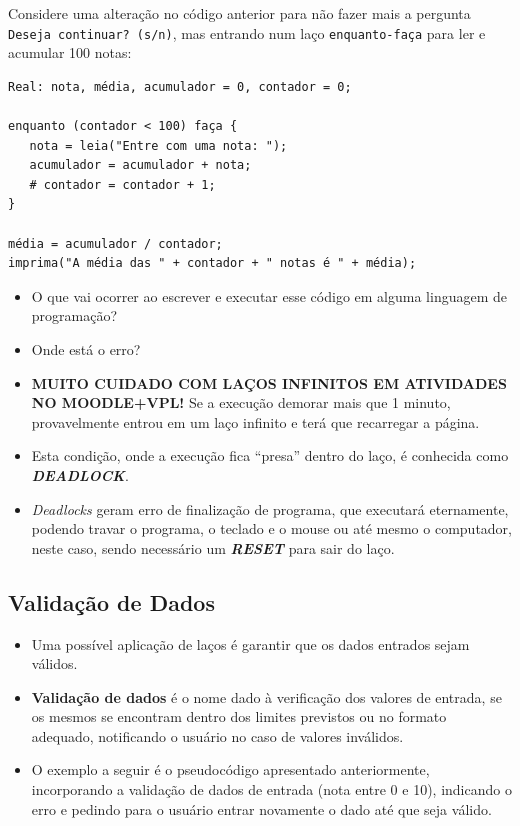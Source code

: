 \documentclass[12pt,a4paper]{article}
\providecommand{\tightlist}{%
      \setlength{\itemsep}{0pt}\setlength{\parskip}{0pt}}
\begin{document}
Considere uma alteração no código anterior para não fazer mais a
pergunta \texttt{Deseja\ continuar?\ (s/n)}, mas entrando num laço
\texttt{enquanto-faça} para ler e acumular 100 notas:

\begin{verbatim}
Real: nota, média, acumulador = 0, contador = 0;

enquanto (contador < 100) faça {
   nota = leia("Entre com uma nota: ");
   acumulador = acumulador + nota;
   # contador = contador + 1;
}

média = acumulador / contador;
imprima("A média das " + contador + " notas é " + média);
\end{verbatim}

    \begin{itemize}
\tightlist
\item
  O que vai ocorrer ao escrever e executar esse código em alguma
  linguagem de programação?
\item
  Onde está o erro?
\item
  \textbf{MUITO CUIDADO COM LAÇOS INFINITOS EM ATIVIDADES NO
  MOODLE+VPL!} Se a execução demorar mais que 1 minuto, provavelmente
  entrou em um laço infinito e terá que recarregar a página.
\item
  Esta condição, onde a execução fica ``presa'' dentro do laço, é
  conhecida como \textbf{\emph{DEADLOCK}}.
\item
  \emph{Deadlocks} geram erro de finalização de programa, que executará
  eternamente, podendo travar o programa, o teclado e o mouse ou até
  mesmo o computador, neste caso, sendo necessário um
  \textbf{\emph{RESET}} para sair do laço.
\end{itemize}

    \hypertarget{validauxe7uxe3o-de-dados}{%
\subsection{Validação de Dados}\label{validauxe7uxe3o-de-dados}}

    \begin{itemize}
\item
  Uma possível aplicação de laços é garantir que os dados entrados sejam
  válidos.
\item
  \textbf{Validação de dados} é o nome dado à verificação dos valores de
  entrada, se os mesmos se encontram dentro dos limites previstos ou no
  formato adequado, notificando o usuário no caso de valores inválidos.
\item
  O exemplo a seguir é o pseudocódigo apresentado anteriormente,
  incorporando a validação de dados de entrada (nota entre 0 e 10),
  indicando o erro e pedindo para o usuário entrar novamente o dado até
  que seja válido.
\end{itemize}
\end{document}
